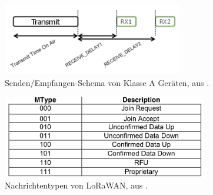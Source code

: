 \begin{figure}[h]
  \centering
	\includegraphics[width=0.7\textwidth]{images/sendrecv.png}
  \caption{Senden/Empfangen-Schema von Klasse A Geräten, aus \cite{lora2015spec}.}
  \label{fig:sendrecv}
\end{figure}

\begin{figure}[h]
  \centering
	\includegraphics[width=0.8\textwidth]{images/mtype.png}
  \caption{Nachrichtentypen von LoRaWAN, aus \cite{lora2015spec}.}
  \label{fig:mtype}
\end{figure}


